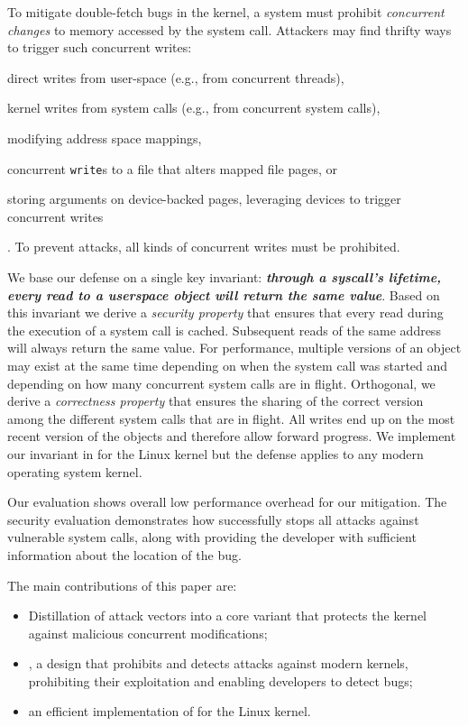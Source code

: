 \documentclass[letterpaper,twocolumn,10pt, anonymous]{article}
\begin{document}
To mitigate double-fetch bugs in the kernel, a system must prohibit
\emph{concurrent changes} to memory accessed by the system call. Attackers may
find thrifty ways to trigger such concurrent writes:
\begin{enumerate*}[label=\textbf{(\roman*)}]
\item  direct writes from user-space (e.g., from concurrent threads),
\item  kernel writes from system calls (e.g., from concurrent system calls),
\item  modifying address space mappings,
\item  concurrent \texttt{write}s to a file that alters mapped
file pages, or
\item  storing arguments on device-backed pages, leveraging devices to trigger
concurrent writes
\end{enumerate*}.
To prevent attacks, all kinds of concurrent writes must be prohibited.

We base our defense on a single key invariant: 
\textbf{\emph{through a syscall's lifetime, every read to a userspace object 
will return the same value}}. Based on this invariant we derive a \emph{security
property} that ensures that every read during the execution of a system call is
cached. Subsequent reads of the same address will always return the same value.
For performance, multiple versions of an object may exist at the same time
depending on when the system call was started and depending on how many
concurrent system calls are in flight. Orthogonal, we derive a \emph{correctness
property} that ensures the sharing of the correct version among the different
system calls that are in flight. All writes end up on the most recent version of
the objects and therefore allow forward progress.
We implement our invariant in \tiktok for the Linux kernel but the defense
applies to any modern operating system kernel.

Our evaluation shows overall low performance overhead for our mitigation.
The security evaluation demonstrates how \tiktok successfully stops all attacks
against vulnerable system calls, along with providing the developer with
sufficient information about the location of the bug.


The main contributions of this paper are:

\begin{itemize}
\item Distillation of \tocttou attack vectors into a core variant that protects
the kernel against malicious concurrent modifications;
\item \tiktok, a design that prohibits and detects
\tocttou attacks against modern kernels, prohibiting their exploitation and
enabling developers to detect \tocttou bugs;
\item an efficient implementation of \tiktok for the Linux kernel.
\end{itemize}
\end{document}
